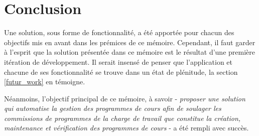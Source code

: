 \chapter{Conclusion}
\label{conclusion}
Une solution, sous forme de fonctionnalité, a été apportée pour chacun des objectifs mis en avant dans les prémices de ce mémoire. Cependant, il faut garder à l'esprit que la solution présentée dans ce mémoire est le résultat d'une première itération de développement. Il serait insensé de penser que l'application et chacune de ses fonctionnalité se trouve dans un état de plénitude, la section \ref{futur_work} en témoigne. 

Néanmoins, l'objectif principal de ce mémoire, à savoir - \textit{proposer une solution qui automatise la gestion des programmes de cours afin de soulager les commissions de programmes de la charge de travail que constitue la création, maintenance et vérification des programmes de cours} - a été rempli avec succès.
